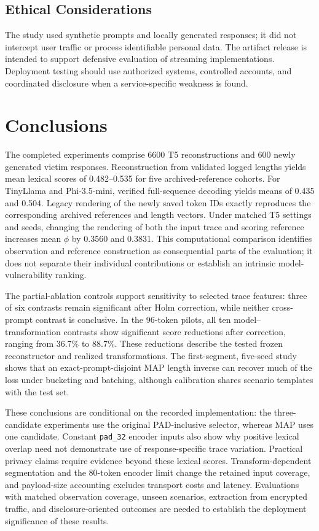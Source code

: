 \documentclass[electronics,article,submit,pdftex,moreauthors]{Definitions/mdpi}
\begin{document}
\subsection{Ethical Considerations}
The study used synthetic prompts and locally generated responses; it did not intercept user traffic or process identifiable personal data. The artifact release is intended to support defensive evaluation of streaming implementations. Deployment testing should use authorized systems, controlled accounts, and coordinated disclosure when a service-specific weakness is found.

\section{Conclusions}
The completed experiments comprise 6600 T5 reconstructions and 600 newly generated victim responses. Reconstruction from validated logged lengths yields mean lexical scores of 0.482--0.535 for five archived-reference cohorts. For TinyLlama and Phi-3.5-mini, verified full-sequence decoding yields means of 0.435 and 0.504. Legacy rendering of the newly saved token IDs exactly reproduces the corresponding archived references and length vectors. Under matched T5 settings and seeds, changing the rendering of both the input trace and scoring reference increases mean $\phi$ by 0.3560 and 0.3831. This computational comparison identifies observation and reference construction as consequential parts of the evaluation; it does not separate their individual contributions or establish an intrinsic model-vulnerability ranking.

The partial-ablation controls support sensitivity to selected trace features: three of six contrasts remain significant after Holm correction, while neither cross-prompt contrast is conclusive. In the 96-token pilots, all ten model--transformation contrasts show significant score reductions after correction, ranging from 36.7\% to 88.7\%. These reductions describe the tested frozen reconstructor and realized transformations. The first-segment, five-seed study shows that an exact-prompt-disjoint MAP length inverse can recover much of the loss under bucketing and batching, although calibration shares scenario templates with the test set.

These conclusions are conditional on the recorded implementation: the three-candidate experiments use the original PAD-inclusive selector, whereas MAP uses one candidate. Constant \texttt{pad\_32} encoder inputs also show why positive lexical overlap need not demonstrate use of response-specific trace variation. Practical privacy claims require evidence beyond these lexical scores. Transform-dependent segmentation and the 80-token encoder limit change the retained input coverage, and payload-size accounting excludes transport costs and latency. Evaluations with matched observation coverage, unseen scenarios, extraction from encrypted traffic, and disclosure-oriented outcomes are needed to establish the deployment significance of these results.
\end{document}

